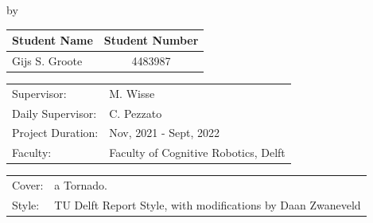 \begin{titlepage}

\begin{center}

{\makeatletter
\largetitlestyle\fontsize{42}{42}\selectfont\@title
\makeatother}

{\makeatletter
\ifdefvoid{\@subtitle}{}{\bigskip\fontsize{16}{16}\selectfont\@subtitle}
\makeatother}

\bigskip
by
\bigskip

{\makeatletter
\largetitlestyle\fontsize{25}{25}\selectfont\@author
\makeatother}

\bigskip

\setlength\extrarowheight{2pt}
\begin{tabular}{lc}
    Student Name & Student Number \\\midrule
    Gijs S. Groote & 4483987 \\
\end{tabular}

\vfill

\begin{tabular}{ll}
    Supervisor: & M. Wisse \\
    Daily Supervisor: & C. Pezzato \\
    Project Duration: & Nov, 2021 - Sept, 2022 \\
    Faculty: & Faculty of Cognitive Robotics, Delft
\end{tabular}

\bigskip

\begin{tabular}{p{15mm}p{10cm}}
    Cover: & a Tornado. \\
    Style: & TU Delft Report Style, with modifications by Daan Zwaneveld
\end{tabular}
\end{center}


\end{titlepage}
